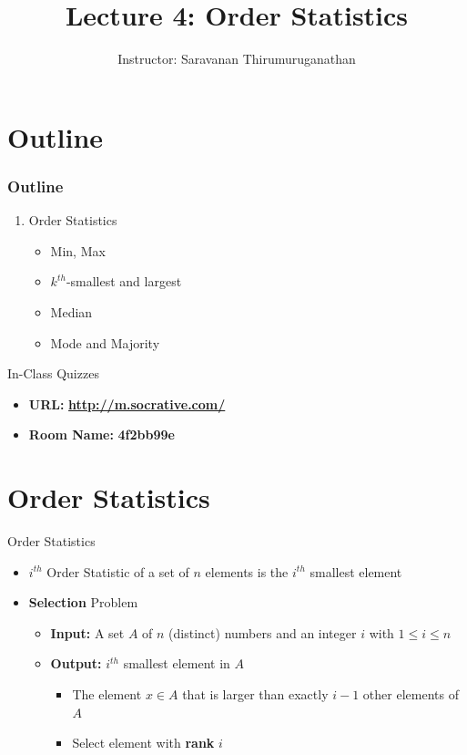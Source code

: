 \documentclass{beamer}
\title[Saravanan Thirumuruganathan] 
{Lecture 4: Order Statistics}
\author[CSE 5311] 
{Instructor: Saravanan Thirumuruganathan}
\date[]
\begin{document}
\begin{frame}
  \titlepage
\end{frame}


\section{Outline}

\begin{frame}
\frametitle {Outline}
\begin{enumerate}
\item Order Statistics
\begin{itemize}
    \item Min, Max
    \item $k^{th}$-smallest and largest
    \item Median 
    \item Mode and Majority
\end{itemize}
\end{enumerate}
\end{frame}

\begin{frame}{In-Class Quizzes}
\begin{itemize}
\item {\Large {\bf URL:}} {\LARGE \bf \url{http://m.socrative.com/}} 
\item {\Large {\bf Room Name:} {\LARGE \bf 4f2bb99e}}
\end{itemize}
\end{frame}

\section{Order Statistics}

\begin{frame}{Order Statistics}
\begin{itemize}
\item $i^{th}$ Order Statistic of a set of $n$ elements is the $i^{th}$ smallest element
\item {\bf Selection} Problem
\begin{itemize}
\item {\bf Input:} A set $A$ of $n$ (distinct) numbers and an integer $i$ with $1 \leq i \leq n$
\item {\bf Output:} $i^{th}$ smallest element in $A$ 
\begin{itemize}
    \item The element $x \in A$ that is larger than exactly $i-1$ other elements of $A$
    \item Select element with {\bf rank} $i$
\end{itemize}
\end{itemize}
\end{itemize}
\end{frame}
\end{document}
